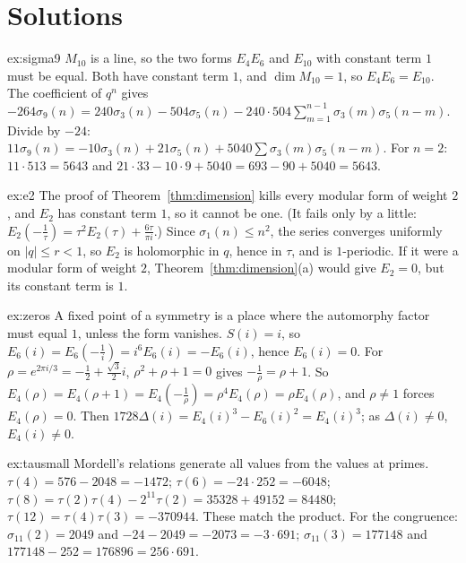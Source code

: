 \section{Solutions}

\begin{solution}{ex:sigma9}
\idea $M_{10}$ is a line, so the two forms $E_4E_6$ and $E_{10}$ with constant term $1$ must be equal.
\writeup Both have constant term $1$, and $\dim M_{10}=1$, so $E_4E_6=E_{10}$. The coefficient of $q^n$ gives
$-264\sigma_9(n)=240\sigma_3(n)-504\sigma_5(n)-240\cdot504\sum_{m=1}^{n-1}\sigma_3(m)\sigma_5(n-m)$. Divide by $-24$: $11\sigma_9(n)=-10\sigma_3(n)+21\sigma_5(n)+5040\sum\sigma_3(m)\sigma_5(n-m)$. For $n=2$: $11\cdot513=5643$ and
$21\cdot33-10\cdot9+5040=693-90+5040=5643$.
\end{solution}

\begin{solution}{ex:e2}
\idea The proof of Theorem~\ref{thm:dimension} kills every modular form of weight $2$, and $E_2$ has constant term $1$, so it cannot be one. (It fails only by a little: $E_2(-\frac1\tau)=\tau^2E_2(\tau)+\frac{6\tau}{\pi i}$.)
\writeup Since $\sigma_1(n)\le n^2$, the series converges uniformly on $|q|\le r<1$, so $E_2$ is holomorphic in $q$, hence in $\tau$, and is $1$-periodic. If it were a modular form of weight $2$, Theorem~\ref{thm:dimension}(a) would give $E_2=0$,
but its constant term is $1$.
\end{solution}

\begin{solution}{ex:zeros}
\idea A fixed point of a symmetry is a place where the automorphy factor must equal $1$, unless the form vanishes.
\writeup $S(i)=i$, so $E_6(i)=E_6(-\frac1i)=i^6E_6(i)=-E_6(i)$, hence $E_6(i)=0$. For $\rho=e^{2\pi i/3}=-\frac12+\frac{\sqrt3}2i$, $\rho^2+\rho+1=0$ gives $-\frac1\rho=\rho+1$. So
$E_4(\rho)=E_4(\rho+1)=E_4(-\frac1\rho)=\rho^4E_4(\rho)=\rho E_4(\rho)$, and $\rho\ne1$ forces $E_4(\rho)=0$. Then $1728\Delta(i)=E_4(i)^3-E_6(i)^2=E_4(i)^3$; as $\Delta(i)\ne0$, $E_4(i)\ne0$.
\end{solution}

\begin{solution}{ex:tausmall}
\idea Mordell's relations generate all values from the values at primes.
\writeup $\tau(4)=576-2048=-1472$; $\tau(6)=-24\cdot252=-6048$; $\tau(8)=\tau(2)\tau(4)-2^{11}\tau(2)=35328+49152=84480$; $\tau(12)=\tau(4)\tau(3)=-370944$. These match the product. For the congruence:
$\sigma_{11}(2)=2049$ and $-24-2049=-2073=-3\cdot691$; $\sigma_{11}(3)=177148$ and $177148-252=176896=256\cdot691$.
\end{solution}

